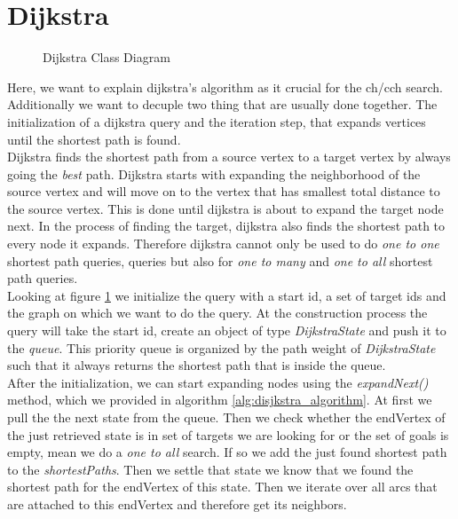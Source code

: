\section{Dijkstra} \label{sec:dijkstra}

\begin{figure}
    \centering
    
    \caption{Dijkstra Class Diagram}
    \label{fig:dijkstra_class}
\end{figure}

Here, we want to explain dijkstra's algorithm as it crucial for the ch/cch search.
Additionally we want to decuple two thing that are usually done together.
The initialization of a dijkstra query and the iteration step, that expands vertices until the shortest path is found.
\\ 
Dijkstra finds the shortest path from a source vertex to a target vertex by always going the \textit{best} path.
Dijkstra starts with expanding the neighborhood of the source vertex and will move on to the vertex that has smallest total distance to the source vertex.
This is done until dijkstra is about to expand the target node next.
In the process of finding the target, dijkstra also finds the shortest path to every node it expands.
Therefore dijkstra cannot only be used to do \textit{one to one} shortest path queries, queries but also for \textit{one to many} and \textit{one to all} shortest path queries.
\\
Looking at figure \ref{fig:dijkstra_class} we initialize the query with a start id, a set of target ids and the graph on which we want to do the query.
At the construction process the query will take the start id, create an object of type \textit{DijkstraState} and push it to the \textit{queue}.
This priority queue is organized by the path weight of \textit{DijkstraState} such that it always returns the shortest path that is inside the queue.
\\
After the initialization, we can start expanding nodes using the \textit{expandNext()} method, which we provided in algorithm \ref{alg:disjkstra_algorithm}.
At first we pull the the next state from the queue.
Then we check whether the endVertex of the just retrieved state is in set of targets we are looking for or the set of goals is empty, mean we do a \textit{one to all} search.
If so we add the just found shortest path to the \textit{shortestPaths}.
Then we settle that state we know that we found the shortest path for the endVertex of this state.
Then we iterate over all arcs that are attached to this endVertex and therefore get its neighbors.
